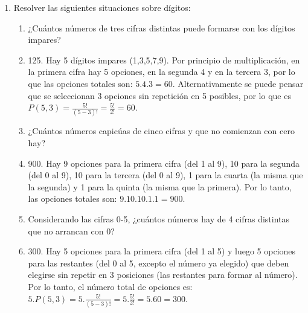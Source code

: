 \documentclass[a4paper]{article}
\newcommand{\answer}{\item[**]}
\newcommand{\exercise}{\item}
\begin{document}
\begin{enumerate}
\begin{enumerate} [label=(\alph*)]
		\item Las niñas desean estar juntas y a los varones les da igual.
		\answer 120960. El grupo de niñas puede considerarse como un bloque a distribuir entre los niños. Los 6 niños más el bloque de niñas se pueden distribuir de $P(7,7)=7!=5040$ formas. Además, dentro del bloque las niñas pueden distribuirse de $P(4,4)=4!=24$ formas. Por lo que las opciones totales son $5040.24=120960$.

		\item Daniela y Pedro no quieren estar juntos.
		\answer 2903040. Primero analizamos las opciones en las que Daniela y Pedro se sientan juntos. Pedro y Daniela conformarían un bloque con $P(2,2)=2!=2$ opciones. Además el bloque se puede distribuir entre los/as restantes niños/as. Las posibilidades son 8 niños/as más el bloque Daniela-Pedro. Por lo que las opciones totales son $P(9,9).P(2,2)=9!.2!=725760$. Luego contamos las opciones de distribuir los 10 niños, es decir, $P(10,10)=3628800$. Finalmente las opciones de que Pedro y Daniela se sienten separados son $P(10,10)-P(9,9).P(2,2)=3628800-725760=2903040$.

	\end{enumerate}

	\exercise Resolver las siguientes situaciones sobre dígitos:
	\begin{enumerate} [label=(\alph*)]
		\item ¿Cuántos números de tres cifras distintas puede formarse con los dígitos impares?
		\answer 125. Hay 5 dígitos impares (1,3,5,7,9). Por principio de multiplicación, en la primera cifra hay 5 opciones, en la segunda 4 y en la tercera 3, por lo que las opciones totales son: $5.4.3 = 60$. Alternativamente se puede pensar que se seleccionan 3 opciones sin repetición en 5 posibles, por lo que es $P(5,3)=\frac{5!}{(5-3)!}=\frac{5!}{2!}=60$.

		\item ¿Cuántos números capicúas de cinco cifras y que no comienzan con cero hay?
		\answer 900. Hay 9 opciones para la primera cifra (del 1 al 9), 10 para la segunda (del 0 al 9), 10 para la tercera (del 0 al 9), 1 para la cuarta (la misma que la segunda) y 1 para la quinta (la misma que la primera). Por lo tanto, las opciones totales son: $9.10.10.1.1=900$.

		\item Considerando las cifras 0-5, ¿cuántos números hay de 4 cifras distintas que no arrancan con 0?
		\answer 300. Hay 5 opciones para la primera cifra (del 1 al 5) y luego 5 opciones para las restantes (del 0 al 5, excepto el número ya elegido) que deben elegirse sin repetir en 3 posiciones (las restantes para formar al número). Por lo tanto, el número total de opciones es: $5.P(5,3)= 5. \frac{5!}{(5-3)!}= 5. \frac{5!}{2!} = 5.60=300$.


\end{enumerate}
\end{enumerate}
\end{document}
